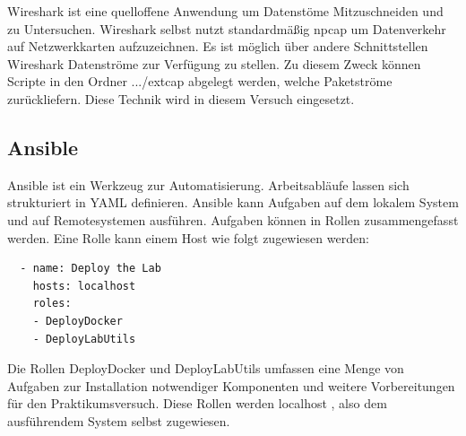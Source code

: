 Wireshark ist eine quelloffene Anwendung um Datenstöme Mitzuschneiden und zu Untersuchen. Wireshark selbst nutzt standardmäßig \grqq npcap \grqq{} um Datenverkehr 
auf Netzwerkkarten aufzuzeichnen. Es ist möglich über andere Schnittstellen Wireshark Datenströme zur Verfügung zu stellen. Zu diesem Zweck
können Scripte in den Ordner \grqq .../extcap \grqq{} abgelegt werden, welche 
Paketströme zurückliefern. Diese Technik wird in diesem Versuch eingesetzt.


\subsection{Ansible}

Ansible ist ein Werkzeug zur Automatisierung. Arbeitsabläufe lassen sich strukturiert in YAML definieren. Ansible kann Aufgaben auf dem lokalem System und auf Remotesystemen
ausführen. Aufgaben können in Rollen zusammengefasst werden.  
Eine Rolle kann einem Host wie folgt zugewiesen werden:
\begin{lstlisting}
  - name: Deploy the Lab
    hosts: localhost
    roles:
    - DeployDocker
    - DeployLabUtils
\end{lstlisting}

Die Rollen \grqq DeployDocker \grqq{} und \grqq DeployLabUtils \grqq{} umfassen eine Menge von Aufgaben zur Installation notwendiger Komponenten und weitere Vorbereitungen
für den Praktikumsversuch. Diese Rollen werden \grqq localhost \grqq{}, also dem ausführendem System selbst zugewiesen.

\subsection{}
